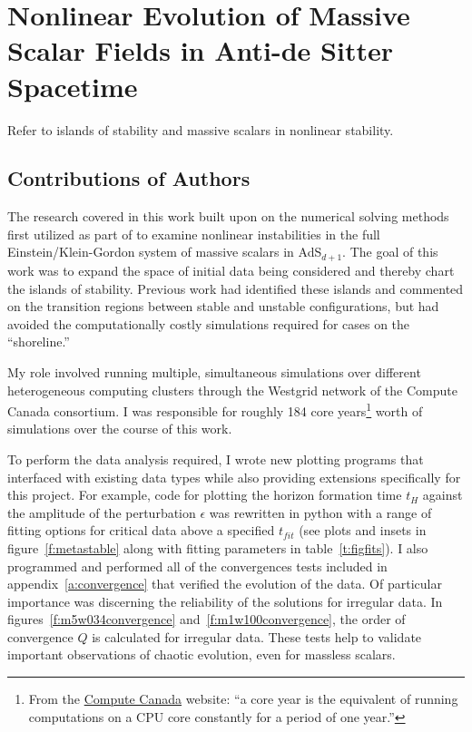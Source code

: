 \documentclass[../PhD.tex]{subfiles}
\begin{document}

\chapter{Nonlinear Evolution of Massive Scalar Fields in Anti-de Sitter Spacetime}

Refer to islands of stability and massive scalars in nonlinear stability.

\section{Contributions of Authors}

The research covered in this work built upon on the numerical solving methods first utilized as part of\cite{1508.02709, 1410.1869} to examine nonlinear instabilities in the full Einstein/Klein-Gordon system of massive scalars in AdS$_{d+1}$. The goal of this work was to expand the space of initial data being considered and thereby chart the islands of stability. Previous work had identified these islands and commented on the transition regions between stable and unstable configurations, but had avoided the computationally costly simulations required for cases on the ``shoreline.'' 

My role involved running multiple, simultaneous simulations over different heterogeneous computing clusters through the Westgrid network of the Compute Canada consortium. I was responsible for roughly 184 core years\footnote{From the \href{https://www.computecanada.ca/}{Compute Canada} website: ``a core year is the equivalent of running computations on a CPU core constantly for a period of one year.''} worth of simulations over the course of this work.

To perform the data analysis required, I wrote new plotting programs that interfaced with existing data types while also providing extensions specifically for this project. For example, code for plotting the horizon formation time $t_H$ against the amplitude of the perturbation $\epsilon$ was rewritten in python with a range of fitting options for critical data above a specified $t_{fit}$ (see plots and insets in figure~\ref{f:metastable} along with fitting parameters in table~\ref{t:figfits}). I also programmed and performed all of the convergences tests included in appendix~\ref{a:convergence} that verified the evolution of the data. Of particular importance was discerning the reliability of the solutions for irregular data. In figures~\ref{f:m5w034convergence} and~\ref{f:m1w100convergence}, the order of convergence $Q$ is calculated for irregular data. These tests help to validate important observations of chaotic evolution, even for massless scalars.
\end{document}
